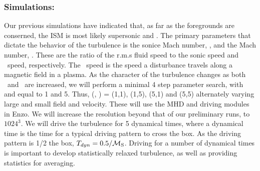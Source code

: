 \subsubsection{Simulations: \nameCMB}
\label{subsec.cmb_sims}

Our previous simulations have indicated that, as far as the foregrounds are
conserned, the ISM is most likely supersonic and \sa.  The primary parameters
that dictate the behavior of the turbulence is the sonice Mach number, \mach,
and the \alf Mach number, \alfmach.  These are the ratio of the r.m.s fluid
speed to the sonic speed and \alf\ speed, respectively.  The \alf\ speed is the
speed a disturbance travels along a magnetic field in a plasma.  As the
character of the turbulence changes as both \mach\ and \alfmach\ are increased,
we will perform a minimal 4 step parameter search, with \mach and \alfmach equal
to 1 and 5.  Thus, (\mach, \alfmach) = (1,1), (1,5), (5,1) and (5,5) alternately
varying large and small field and velocity.  These will use the MHD and driving
modules in Enzo.  We will increase the resolution beyond that of our preliminary
runs, to $1024^3$.  We will drive the turbulence for 5 dynamical times, where a
dynamical time is the time for a typical driving pattern to cross the box.  As
the driving pattern is 1/2 the box, $T_{dyn}=0.5/\mathcal{M_{\rm{S}}}$.  Driving for a number
of dynamical times is important to develop statistically relaxed turbulence, as
well as providing statistics for averaging.  
